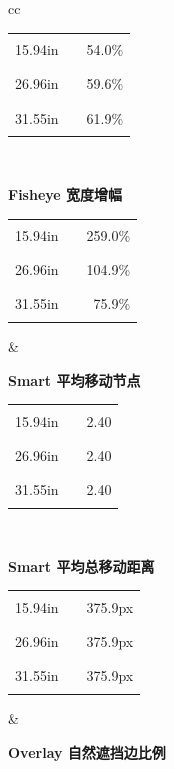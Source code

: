 \documentclass[11pt,a4paper,oneside,extrafontsizes]{memoir}
\begin{document}
\begin{center}
\begin{figure}[htbp]
\begin{tabular}{cc}
\begin{minipage}[t]{0.46\textwidth}
\begin{tabular}{@{}r l r@{}}
15.94in & \textcolor{blue!70!black}{\rule{0.1745\textwidth}{1.1ex}} & 54.0\% \\
26.96in & \textcolor{blue!70!black}{\rule{0.1926\textwidth}{1.1ex}} & 59.6\% \\
31.55in & \textcolor{blue!70!black}{\rule{0.2000\textwidth}{1.1ex}} & 61.9\% \\
\end{tabular}
\end{minipage} \\[1.2em]
\begin{minipage}[t]{0.46\textwidth}
\centering
\textbf{Fisheye 宽度增幅}\\[-0.2em]

\begin{tabular}{@{}r l r@{}}
15.94in & \textcolor{blue!70!black}{\rule{0.2000\textwidth}{1.1ex}} & 259.0\% \\
26.96in & \textcolor{blue!70!black}{\rule{0.0810\textwidth}{1.1ex}} & 104.9\% \\
31.55in & \textcolor{blue!70!black}{\rule{0.0586\textwidth}{1.1ex}} & 75.9\% \\
\end{tabular}
\end{minipage}
&
\begin{minipage}[t]{0.46\textwidth}
\centering
\textbf{Smart 平均移动节点}\\[-0.2em]

\begin{tabular}{@{}r l r@{}}
15.94in & \textcolor{blue!70!black}{\rule{0.2000\textwidth}{1.1ex}} & 2.40 \\
26.96in & \textcolor{blue!70!black}{\rule{0.2000\textwidth}{1.1ex}} & 2.40 \\
31.55in & \textcolor{blue!70!black}{\rule{0.2000\textwidth}{1.1ex}} & 2.40 \\
\end{tabular}
\end{minipage} \\[1.2em]
\begin{minipage}[t]{0.46\textwidth}
\centering
\textbf{Smart 平均总移动距离}\\[-0.2em]

\begin{tabular}{@{}r l r@{}}
15.94in & \textcolor{blue!70!black}{\rule{0.2000\textwidth}{1.1ex}} & 375.9px \\
26.96in & \textcolor{blue!70!black}{\rule{0.2000\textwidth}{1.1ex}} & 375.9px \\
31.55in & \textcolor{blue!70!black}{\rule{0.2000\textwidth}{1.1ex}} & 375.9px \\
\end{tabular}
\end{minipage}
&
\begin{minipage}[t]{0.46\textwidth}
\centering
\textbf{Overlay 自然遮挡边比例}\\[-0.2em]


\end{minipage}
\end{tabular}
\end{figure}
\end{center}
\end{document}
